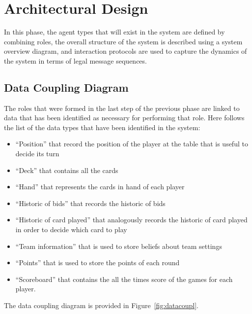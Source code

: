 \documentclass[a4paper]{article}
\begin{document}
\newpage 

\section{Architectural Design}\label{sec:highdesign}

In this phase, the agent types that will exist in the system are defined by combining roles, the overall structure of the system is described using a system overview diagram, and interaction protocols are used to capture the dynamics of the system in terms of legal message sequences.

\subsection{Data Coupling Diagram}

The roles that were formed in the last step of the previous phase are linked to data that has been identified as necessary for performing that role. Here follows the list of the data types that have been identified in the system: 
\begin{itemize}
  \item ``Position'' that record the position of the player at the table that is useful to decide its turn
  \item ``Deck'' that contains all the cards
  \item ``Hand'' that represents the cards in hand of each player
  \item ``Historic of bids'' that records the historic of bids
  \item ``Historic of card played'' that analogously records the historic of card played in order to decide which card to play
  \item ``Team information'' that is used to store beliefs about team settings
  \item ``Points'' that is used to store the points of each round
  \item ``Scoreboard'' that contains the all the times score of the games for each player. 
\end{itemize}

The data coupling diagram is provided in Figure~\ref{fig:datacoupl}.
\end{document}
